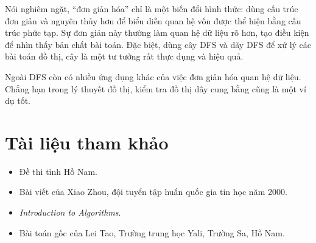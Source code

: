 \documentclass[11pt]{article}
\begin{document}
Nói nghiêm ngặt, ``đơn giản hóa'' chỉ là một biến đổi hình thức: dùng cấu trúc
đơn giản và nguyên thủy hơn để biểu diễn quan hệ vốn được thể hiện bằng cấu
trúc phức tạp. Sự đơn giản này thường làm quan hệ dữ liệu rõ hơn, tạo điều
kiện để nhìn thấy bản chất bài toán. Đặc biệt, dùng cây DFS và dãy DFS để xử
lý các bài toán đồ thị, cây là một tư tưởng rất thực dụng và hiệu quả.

Ngoài DFS còn có nhiều ứng dụng khác của việc đơn giản hóa quan hệ dữ liệu.
Chẳng hạn trong lý thuyết đồ thị, kiểm tra đồ thị dây cung bằng  cũng là một ví dụ tốt.

\section*{Tài liệu tham khảo}

\begin{itemize}
  \item Đề thi tỉnh Hồ Nam.
  \item Bài viết của Xiao Zhou, đội tuyển tập huấn quốc gia tin học năm 2000.
  \item \textit{Introduction to Algorithms}.
  \item Bài toán gốc của Lei Tao, Trường trung học Yali, Trường Sa, Hồ Nam.
\end{itemize}
\end{document}
